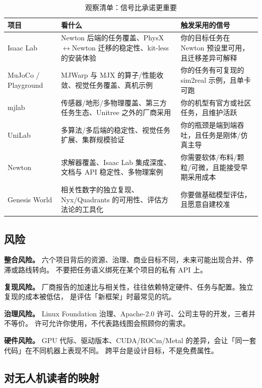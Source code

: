 \documentclass[UTF8, 11pt, a4paper, fontset=windows]{ctexart}
\begin{document}
\begin{table}[htbp]
\centering
\caption{观察清单：信号比承诺更重要}
\label{tab:watch}
\small
\begin{tabularx}{\linewidth}{@{}L{2.2cm}L{5.0cm}Y@{}}
\toprule
\textbf{项目} & \textbf{看什么} & \textbf{触发采用的信号} \\
\midrule
Isaac Lab & Newton 后端的任务覆盖、PhysX$\leftrightarrow$Newton 迁移的稳定性、kit-less 的安装体验 & 你的目标任务在 Newton 预设里可用，且迁移差异可解释 \\
MuJoCo / Playground & MJWarp 与 MJX 的算子/性能收敛、视觉任务覆盖、真机示例 & 你的任务有可复现的 sim2real 示例，且单卡可跑 \\
mjlab & 传感器/地形/多物理覆盖、第三方任务生态、Unitree 之外的厂商采用 & 你的机型有官方或社区任务，且维护活跃 \\
UniLab & 多算法/多后端的稳定性、视觉任务扩展、集群规模验证 & 你的瓶颈是端到端吞吐，且任务是刚体/仿真主导 \\
Newton & 求解器覆盖、Isaac Lab 集成深度、文档与 API 稳定性、多物理案例 & 你需要软体/布料/颗粒/可微，且能接受早期采用成本 \\
Genesis World & 相关性数字的独立复现、Nyx/Quadrants 的可用性、评估方法论的工具化 & 你要做基础模型评估，且愿意自建校准 \\
\bottomrule
\end{tabularx}
\end{table}

\subsection{风险}

\textbf{整合风险。} 六个项目背后的资源、治理、商业目标不同，未来可能出现合并、停滞或路线转向。
不要把任务语义绑死在某个项目的私有 API 上。

\textbf{复现风险。} 厂商报告的加速比与相关性，往往依赖特定硬件、任务与配置。独立复现的成本被低估，
是评估「新框架」时最常见的坑。

\textbf{治理风险。} Linux Foundation 治理、Apache-2.0 许可、公司主导的开发，三者并不等价。
许可允许你使用，不代表路线图会照顾你的需求。

\textbf{硬件风险。} GPU 代际、驱动版本、CUDA/ROCm/Metal 的差异，会让「同一套代码」在不同机器上表现不同。
跨平台是设计目标，不是免费属性。

\subsection{对无人机读者的映射}
\end{document}
